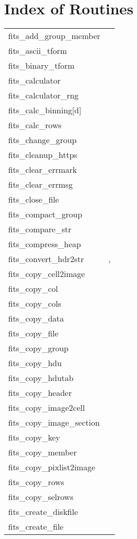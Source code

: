 \documentclass[11pt]{book}
\begin{document}
\chapter{Index of Routines }
\begin{tabular}{lr}
fits\_add\_group\_member & \pageref{ffgtam} \\
fits\_ascii\_tform    & \pageref{ffasfm} \\
fits\_binary\_tform   & \pageref{ffbnfm} \\
fits\_calculator     & \pageref{ffcalc} \\
fits\_calculator\_rng     & \pageref{ffcalcrng} \\
fits\_calc\_binning[d] & \pageref{calcbinning} \\
fits\_calc\_rows    & \pageref{ffcrow} \\
fits\_change\_group  & \pageref{ffgtch} \\
fits\_cleanup\_https & \pageref{ffihtps} \\
fits\_clear\_errmark  & \pageref{ffpmrk} \\
fits\_clear\_errmsg   & \pageref{ffcmsg} \\
fits\_close\_file     & \pageref{ffclos} \\
fits\_compact\_group & \pageref{ffgtcm} \\
fits\_compare\_str    & \pageref{ffcmps} \\
fits\_compress\_heap & \pageref{ffcmph} \\
fits\_convert\_hdr2str  & \pageref{ffhdr2str}, \pageref{hdr2str} \\
fits\_copy\_cell2image & \pageref{copycell} \\
fits\_copy\_col     & \pageref{ffcpcl} \\
fits\_copy\_cols    & \pageref{ffccls} \\
fits\_copy\_data      & \pageref{ffcpdt} \\
fits\_copy\_file      & \pageref{ffcpfl} \\
fits\_copy\_group    & \pageref{ffgtcp} \\
fits\_copy\_hdu       & \pageref{ffcopy} \\
fits\_copy\_hdutab    & \pageref{ffcpht} \\
fits\_copy\_header    & \pageref{ffcphd} \\
fits\_copy\_image2cell & \pageref{copycell} \\
fits\_copy\_image\_section  & \pageref{ffcpimg} \\
fits\_copy\_key           & \pageref{ffcpky} \\
fits\_copy\_member    & \pageref{ffgmcp} \\
fits\_copy\_pixlist2image & \pageref{copypixlist2image} \\
fits\_copy\_rows &   \pageref{ffcprw} \\
fits\_copy\_selrows &   \pageref{ffcpsr} \\
fits\_create\_diskfile    & \pageref{ffinit} \\
fits\_create\_file    & \pageref{ffinit} \\

\end{tabular}
\end{document}
